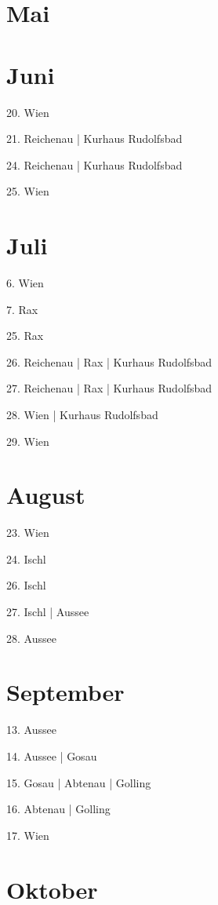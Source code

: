 \documentclass[twoside=false,titlepage=false,open=any, parskip=never, fontsize=10pt, headings=small, chapterprefix=false, appendixprefix=false, DIV=15]{scrbook}
\begin{document}
\begin{multicols}{3}
            \section*{Mai}
            \section*{Juni}
            20. Wien\par
            21. Reichenau | Kurhaus Rudolfsbad\par
            24. Reichenau | Kurhaus Rudolfsbad\par
            25. Wien\par
            \section*{Juli}
            6. Wien\par
            7. Rax\par
            25. Rax\par
            26. Reichenau | Rax | Kurhaus Rudolfsbad\par
            27. Reichenau | Rax | Kurhaus Rudolfsbad\par
            28. Wien | Kurhaus Rudolfsbad\par
            29. Wien\par
            \section*{August}
            23. Wien\par
            24. Ischl\par
            26. Ischl\par
            27. Ischl | Aussee\par
            28. Aussee\par
            \section*{September}
            13. Aussee\par
            14. Aussee | Gosau\par
            15. Gosau | Abtenau | Golling\par
            16. Abtenau | Golling\par
            17. Wien\par
            \section*{Oktober}

\end{multicols}
\end{document}
